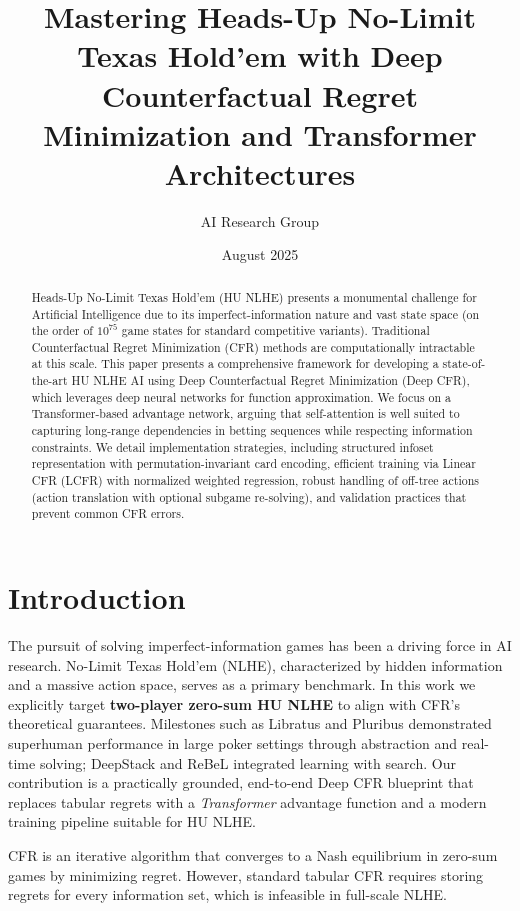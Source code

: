 \documentclass[11pt,a4paper]{article}
\title{Mastering Heads-Up No-Limit Texas Hold'em with Deep Counterfactual Regret Minimization and Transformer Architectures}
\author[1]{AI Research Group}
\affil[1]{(Organization/Affiliation)}
\date{August 2025}
\begin{document}
\maketitle

\begin{abstract}
Heads-Up No-Limit Texas Hold'em (HU NLHE) presents a monumental challenge for Artificial Intelligence due to its imperfect-information nature and vast state space (on the order of $10^{75}$ game states for standard competitive variants). Traditional Counterfactual Regret Minimization (CFR) methods are computationally intractable at this scale. This paper presents a comprehensive framework for developing a state-of-the-art HU NLHE AI using Deep Counterfactual Regret Minimization (Deep CFR), which leverages deep neural networks for function approximation. We focus on a Transformer-based advantage network, arguing that self-attention is well suited to capturing long-range dependencies in betting sequences while respecting information constraints. We detail implementation strategies, including structured infoset representation with permutation-invariant card encoding, efficient training via Linear CFR (LCFR) with normalized weighted regression, robust handling of off-tree actions (action translation with optional subgame re-solving), and validation practices that prevent common CFR errors.
\end{abstract}

\section{Introduction}

The pursuit of solving imperfect-information games has been a driving force in AI research. No-Limit Texas Hold'em (NLHE), characterized by hidden information and a massive action space, serves as a primary benchmark. In this work we explicitly target \textbf{two-player zero-sum HU NLHE} to align with CFR's theoretical guarantees. Milestones such as Libratus \cite{brown2017superhuman} and Pluribus \cite{brown2019superhuman} demonstrated superhuman performance in large poker settings through abstraction and real-time solving; DeepStack \cite{moravcik2017deepstack} and ReBeL \cite{brown2020rebel} integrated learning with search. Our contribution is a practically grounded, end-to-end Deep CFR blueprint that replaces tabular regrets with a \emph{Transformer} advantage function and a modern training pipeline suitable for HU NLHE.

CFR \cite{zinkevich2007regret} is an iterative algorithm that converges to a Nash equilibrium in zero-sum games by minimizing regret. However, standard tabular CFR requires storing regrets for every information set, which is infeasible in full-scale NLHE.
\end{document}
